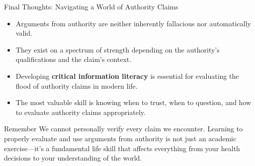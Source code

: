 \documentclass{beamer}
\begin{document}
\begin{frame}{Final Thoughts: Navigating a World of Authority Claims}
    \begin{itemize}
        \item Arguments from authority are neither inherently fallacious nor automatically valid.
        \item They exist on a spectrum of strength depending on the authority's qualifications and the claim's context.
        \item Developing \textbf{critical information literacy} is essential for evaluating the flood of authority claims in modern life.
        \item The most valuable skill is knowing when to trust, when to question, and how to evaluate authority claims appropriately.
    \end{itemize}
    
    \begin{alertblock}{Remember}
        We cannot personally verify every claim we encounter. Learning to properly evaluate and use arguments from authority is not just an academic exercise—it's a fundamental life skill that affects everything from your health decisions to your understanding of the world.
    \end{alertblock}
\end{frame}
\end{document}
